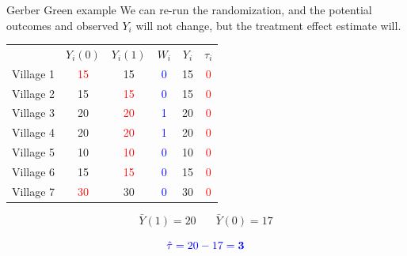 \documentclass[xcolor={dvipsnames},handout]{beamer}
\begin{document}
\begin{frame}{Gerber Green example}
We can re-run the randomization, and the potential outcomes and observed $Y_i$ will not change, but the treatment effect estimate will.

\begin{table}[]
\begin{tabular}{lccccc}
& $Y_i(0)$ & $Y_i(1)$ & $W_i$ & $Y_i$ & $\tau_i$ \\
Village 1 & \textcolor{red}{15} & 15 & \textcolor{blue}{0} & 15 & \textcolor{red}{0} \\
Village 2 & 15 & \textcolor{red}{15} & \textcolor{blue}{0} & 15 &\textcolor{red}{0} \\
Village 3 & 20 & \textcolor{red}{20} & \textcolor{blue}{1} & 20 &\textcolor{red}{0} \\
Village 4 & 20 & \textcolor{red}{20} & \textcolor{blue}{1} & 20 &\textcolor{red}{0} \\
Village 5 & 10 & \textcolor{red}{10} & \textcolor{blue}{0} & 10 &\textcolor{red}{0} \\
Village 6 & 15 & \textcolor{red}{15} & \textcolor{blue}{0} & 15 &\textcolor{red}{0} \\
Village 7 & \textcolor{red}{30} & 30 & \textcolor{blue}{0} & 30 &\textcolor{red}{0}
\end{tabular}
\end{table}

$$
\bar{Y}(1) = 20 \ \ \ \ \ \ \ \ \bar{Y}(0) = 17
$$

$$
\color{blue}{\hat{\tau} = 20-17= \bm{3}}
$$

\end{frame}


\end{document}
